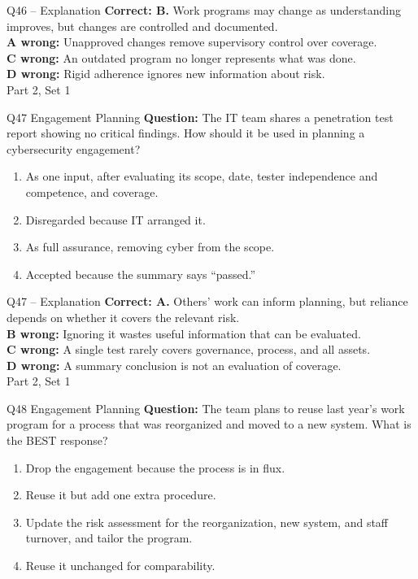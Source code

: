 \documentclass[aspectratio=169,10pt]{beamer}
\begin{document}
\begin{frame}[t]{Q46 -- Explanation}
	\footnotesize
	\textbf{Correct: B.} Work programs may change as understanding improves, but changes are controlled and documented. \\[5pt]
\textbf{A wrong:} Unapproved changes remove supervisory control over coverage. \\[3pt]
\textbf{C wrong:} An outdated program no longer represents what was done. \\[3pt]
\textbf{D wrong:} Rigid adherence ignores new information about risk. \\[3pt]
	\vfill {\tiny Part 2, Set 1}
\end{frame}
\begin{frame}[t]{Q47 \hfill {\scriptsize Engagement Planning}}
	\small
	\textbf{Question:} The IT team shares a penetration test report showing no critical findings. How should it be used in planning a cybersecurity engagement?
	\begin{enumerate}[label=\Alph*.,itemsep=1pt,topsep=3pt]
			\item As one input, after evaluating its scope, date, tester independence and competence, and coverage.
			\item Disregarded because IT arranged it.
			\item As full assurance, removing cyber from the scope.
			\item Accepted because the summary says ``passed.''
	\end{enumerate}
\end{frame}
\begin{frame}[t]{Q47 -- Explanation}
	\footnotesize
	\textbf{Correct: A.} Others' work can inform planning, but reliance depends on whether it covers the relevant risk. \\[5pt]
\textbf{B wrong:} Ignoring it wastes useful information that can be evaluated. \\[3pt]
\textbf{C wrong:} A single test rarely covers governance, process, and all assets. \\[3pt]
\textbf{D wrong:} A summary conclusion is not an evaluation of coverage. \\[3pt]
	\vfill {\tiny Part 2, Set 1}
\end{frame}
\begin{frame}[t]{Q48 \hfill {\scriptsize Engagement Planning}}
	\small
	\textbf{Question:} The team plans to reuse last year's work program for a process that was reorganized and moved to a new system. What is the BEST response?
	\begin{enumerate}[label=\Alph*.,itemsep=1pt,topsep=3pt]
			\item Drop the engagement because the process is in flux.
			\item Reuse it but add one extra procedure.
			\item Update the risk assessment for the reorganization, new system, and staff turnover, and tailor the program.
			\item Reuse it unchanged for comparability.
	\end{enumerate}
\end{frame}
\end{document}
